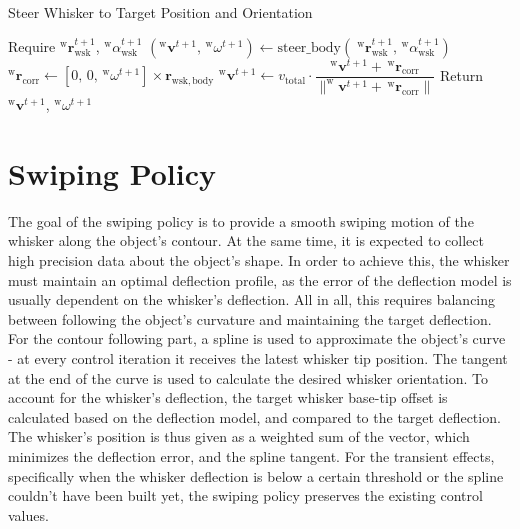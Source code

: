 \begin{algorithm}[htb]
    \caption{Steer Whisker to Target Position and Orientation}
    \begin{algorithmic}
        \State Require \(^{\mathrm{w}}\boldsymbol{r}_{\mathrm{wsk}}^{t+1}\), \(^{\mathrm{w}}\alpha_{\mathrm{wsk}}^{t+1}\)
        \State \((^{\mathrm{w}}\boldsymbol{v}^{t+1},\, ^{\mathrm{w}}\omega^{t+1}) \gets \mathrm{steer\_body}(\;^{\mathrm{w}}\boldsymbol{r}_{\mathrm{wsk}}^{t+1},\, ^{\mathrm{w}}\alpha_{\mathrm{wsk}}^{t+1})\)
        \State \(^{\mathrm{w}}\boldsymbol{r}_{\mathrm{corr}} \gets [0,\,0,\,^{\mathrm{w}}\omega^{t+1}] \times \boldsymbol{r}_{\mathrm{wsk, body}}\) 
        \State \(^{\mathrm{w}}\boldsymbol{v}^{t+1} \gets v_{\mathrm{total}} \cdot \dfrac{^{\mathrm{w}}\boldsymbol{v}^{t+1} + \,^{\mathrm{w}}\boldsymbol{r}_{\mathrm{corr}}}{\|^{\mathrm{w}}\boldsymbol{v}^{t+1} + \,^{\mathrm{w}}\boldsymbol{r}_{\mathrm{corr}}\|}\)
        \State Return \(^{\mathrm{w}}\boldsymbol{v}^{t+1}\), \(^{\mathrm{w}}\omega^{t+1}\)
    \end{algorithmic}
    \label{alg:steer_whisker}
\end{algorithm}


\section{Swiping Policy}

The goal of the swiping policy is to provide a smooth swiping motion of the whisker along the object's contour.
At the same time, it is expected to collect high precision data about the object's shape.
In order to achieve this, the whisker must maintain an optimal deflection profile, as the error of the deflection model is usually dependent on the whisker's deflection.
All in all, this requires balancing between following the object's curvature and maintaining the target deflection.
For the contour following part, a spline is used to approximate the object's curve - at every control iteration it receives the latest whisker tip position.
The tangent at the end of the curve is used to calculate the desired whisker orientation.
To account for the whisker's deflection, the target whisker base-tip offset is calculated based on the deflection model, and compared to the target deflection.
The whisker's position is thus given as a weighted sum of the vector, which minimizes the deflection error, and the spline tangent.
For the transient effects, specifically when the whisker deflection is below a certain threshold or the spline couldn't have been built yet, the swiping policy preserves the existing control values.

